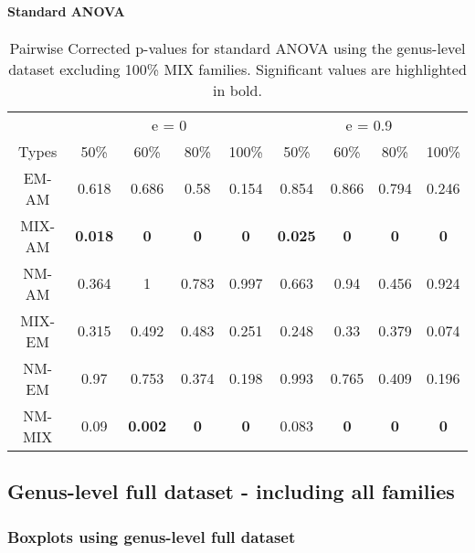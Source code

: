 \documentclass[]{article}
\let\oldparagraph\paragraph
\renewcommand{\paragraph}[1]{\oldparagraph{#1}\mbox{}}
\begin{document}
\hypertarget{standard-anova-5}{%
\paragraph{Standard ANOVA}\label{standard-anova-5}}

\begin{table}[H]

\caption{\label{tab:unnamed-chunk-27}Pairwise Corrected p-values for standard ANOVA using the genus-level dataset excluding 100\% MIX families. Significant values are highlighted in bold.}
\centering
\begin{tabular}{c|c|c|c|c|c|c|c|c}
\hline
\multicolumn{1}{c|}{ } & \multicolumn{4}{c|}{e = 0} & \multicolumn{4}{c}{e = 0.9} \\
\cline{2-5} \cline{6-9}
Types & 50\% & 60\% & 80\% & 100\% & 50\% & 60\% & 80\% & 100\%\\
\hline
EM-AM & 0.618 & 0.686 & 0.58 & 0.154 & 0.854 & 0.866 & 0.794 & 0.246\\
\hline
MIX-AM & \textbf{0.018} & \textbf{0} & \textbf{0} & \textbf{0} & \textbf{0.025} & \textbf{0} & \textbf{0} & \textbf{0}\\
\hline
NM-AM & 0.364 & 1 & 0.783 & 0.997 & 0.663 & 0.94 & 0.456 & 0.924\\
\hline
MIX-EM & 0.315 & 0.492 & 0.483 & 0.251 & 0.248 & 0.33 & 0.379 & 0.074\\
\hline
NM-EM & 0.97 & 0.753 & 0.374 & 0.198 & 0.993 & 0.765 & 0.409 & 0.196\\
\hline
NM-MIX & 0.09 & \textbf{0.002} & \textbf{0} & \textbf{0} & 0.083 & \textbf{0} & \textbf{0} & \textbf{0}\\
\hline
\end{tabular}
\end{table}

\hypertarget{genus-level-full-dataset---including-all-families}{%
\subsection{Genus-level full dataset - including all
families}\label{genus-level-full-dataset---including-all-families}}

\hypertarget{boxplots-using-genus-level-full-dataset}{%
\subsubsection{Boxplots using genus-level full
dataset}\label{boxplots-using-genus-level-full-dataset}}
\end{document}
